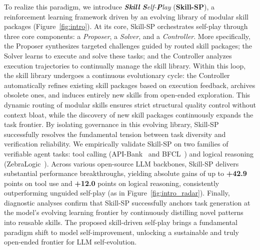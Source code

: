 To realize this paradigm, we introduce \emph{\textbf{Skill} \textbf{S}elf-\textbf{P}lay} (\textbf{Skill-SP}), a reinforcement learning framework driven by an evolving library of modular skill packages (Figure~\ref{fig:intro}). 
At its core, Skill-SP orchestrates self-play through three core components: a \emph{Proposer}, a \emph{Solver}, and a \emph{Controller}. 
More specifically, the Proposer synthesizes targeted challenges guided by routed skill packages; the Solver learns to execute and solve these tasks; and the Controller analyzes execution trajectories to continually manage the skill library. 
Within this loop, the skill library undergoes a continuous evolutionary cycle: the Controller automatically refines existing skill packages based on execution feedback, archives obsolete ones, and induces entirely new skills from open-ended exploration. 
This dynamic routing of modular skills ensures strict structural quality control without context bloat, while the discovery of new skill packages continuously expands the task frontier. 
By isolating governance in this evolving library, Skill-SP successfully resolves the fundamental tension between task diversity and verification reliability.
%
%
We empirically validate Skill-SP on two families of verifiable agent tasks: tool calling (API-Bank~\citep{li2023api} and BFCL~\citep{patil2025berkeley}) and logical reasoning (ZebraLogic~\citep{lin2025zebralogic}). Across various open-source LLM backbones, Skill-SP delivers substantial performance breakthroughs, yielding absolute gains of up to \textbf{+42.9} points on tool use and \textbf{+12.0} points on logical reasoning, consistently outperforming unguided self-play (as in Figure~\ref{fig:intro_radar}).
Finally, diagnostic analyses confirm that Skill-SP successfully anchors task generation at the model's evolving learning frontier by continuously distilling novel patterns into reusable skills. The proposed skill-driven self-play brings a fundamental paradigm shift to model self-improvement, unlocking a sustainable and truly open-ended frontier for LLM self-evolution.